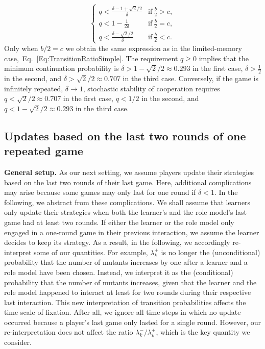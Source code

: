 \documentclass[11pt]{article}
\theoremstyle{plainCl1}
\theoremstyle{plainCl2}
\begin{document}
\begin{equation} \label{Eq:Condition_TwoGames}
\begin{cases}
  q <\frac{\delta - 1 + \sqrt{2}/2}{\delta}	&\text{if}~ \frac{b}{2} > c , \\[0.15cm]
  q<1-\frac{1}{2\delta}	&\text{if}~\frac{b}{2}=c , \\[0.15cm]
  q <\frac{\delta - \sqrt{2}/2}{\delta}\ &\text{if}~\frac{b}{2} < c .
\end{cases}
\end{equation}
Only when \(b/2\!=\!c\) we obtain the same expression as in the limited-memory case,~Eq.~\eqref{Eq:TransitionRatioSimple}. 
The requirement $q\!\ge\!0$ implies that the minimum continuation probability is $\delta\!>\!1\!-\!\sqrt{2}/2\approx 0.293$ in the first case, $\delta\!>\!\frac{1}{2}$ in the second, and $\delta>\sqrt{2}/2\approx 0.707$ in the third case. 
Conversely, if the game is infinitely repeated, $\delta\!\rightarrow\!1$, stochastic stability of cooperation requires $q<\sqrt{2}/2\approx 0.707$ in the first case, $q<1/2$ in the second, and $q<1\!-\!\sqrt{2}/2\approx 0.293$ in the third case. 




\subsection{Updates based on the last two rounds of one repeated game}
\label{section:m_two_n_one}


{\bf General setup.} As our next setting, we assume players update their strategies based on the last two rounds of their last game. 
Here, additional complications may arise because some games may only last for one round if $\delta\!<\!1$.
In the following, we abstract from these complications.  
We shall assume that learners only update their strategies when both the learner's and the role model's last game had at least two rounds. 
If either the learner or the role model only engaged in a one-round game in their previous interaction, we assume the learner decides to keep its strategy. 
As a result, in the following, we accordingly re-interpret some of our quantities. 
For example, $\lambda^+_k$ is no longer the (unconditional) probability that the number of mutants increases by one after a learner and a role model have been chosen.
Instead, we interpret it as the (conditional) probability that the number of mutants increases, given that the learner and the role model happened to interact at least for two rounds during their respective last interaction. 
This new interpretation of transition probabilities affects the time scale of fixation. 
After all, we ignore all time steps in which no update occurred because a player's last game only lasted for a single round.
However, our re-interpretation does not affect the ratio $\lambda^-_k/\lambda^+_k$, which is the key quantity we consider.\\ 
\end{document}

